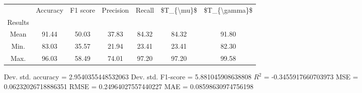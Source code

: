 \begin{tabular}{|c|c|c|c|c|c|c|}
\toprule
{} &  Accuracy &  F1 score &  Precision &  Recall &  \$T\_\{\textbackslash mu\}\$ &  \$T\_\{\textbackslash gamma\}\$ \\
Results &           &           &            &         &            &               \\
\hline
Mean    &     91.44 &     50.03 &      37.83 &   84.32 &      84.32 &         91.80 \\
Min.    &     83.03 &     35.57 &      21.94 &   23.41 &      23.41 &         82.30 \\
Max.    &     96.03 &     58.49 &      74.01 &   97.20 &      97.20 &         99.58 \\
\bottomrule
\end{tabular}

 Dev. std. accuracy = 2.9540355448532063
 Dev. std. F1-score = 5.881045908638808
 $R^2$ = -0.3455917660703973
 MSE = 0.06232026718886351
 RMSE = 0.24964027557440227
 MAE = 0.08598630974756198